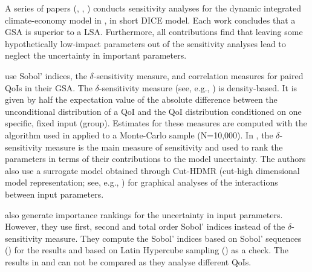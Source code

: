 \documentclass[a4paper,12pt]{article}
\begin{document}
\newline
A series of papers (\cite{Anderson.2014}, \cite{Butler.2014}, \cite{Miftakhova.2018}) conducts sensitivity analyses for the dynamic integrated climate-economy model in \cite{Nordhaus.2008}, in short DICE model.  Each work concludes that a GSA is superior to a LSA. Furthermore, all contributions find that leaving some hypothetically low-impact parameters out of the sensitivity analyses lead \citeauthor{Nordhaus.2008} to neglect the uncertainty in important parameters.

\cite{Anderson.2014} use Sobol' indices, the $\delta$-sensitivity measure, and correlation measures for paired QoIs in their GSA. The $\delta$-sensitivity measure (see, e.g., \cite{Borgonovo.2006}) is density-based. It is given by half the expectation value of the absolute difference between the unconditional distribution of a QoI and the QoI distribution conditioned on one specific, fixed input (group). Estimates for these measures are computed with the algorithm used in \cite{Plischke.2013} applied to a Monte-Carlo sample (N=10,000). In \cite{Anderson.2014}, the $\delta$-sensitivity measure is the main measure of sensitivity and used to rank the parameters in terms of their contributions to the model uncertainty. The authors also use a surrogate model obtained through Cut-HDMR (cut-high dimensional model representation; see, e.g., \cite{Ziehn.2009}) for graphical analyses of the interactions between input parameters.

\cite{Butler.2014} also generate importance rankings for the uncertainty in input parameters. However, they use first, second and total order Sobol' indices instead of the $\delta$-sensitivity measure. They compute the Sobol' indices based on Sobol' sequences (\cite{Sobol.1967}) for the results and based on Latin Hypercube sampling (\cite{McKay.1979}) as a check. The results in \cite{Butler.2014} and \cite{Anderson.2014} can not be compared as they analyse different QoIs.
\end{document}
